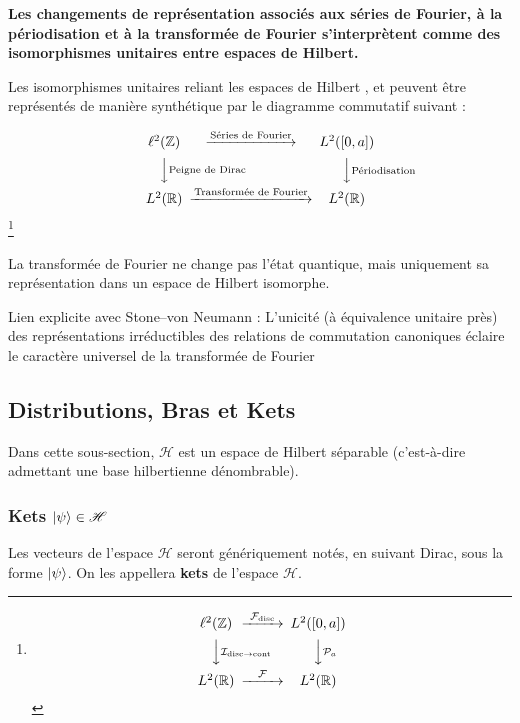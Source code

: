 {\bf
Les changements de représentation associés aux séries de Fourier, à la périodisation et à la transformée de Fourier s’interprètent comme des isomorphismes unitaires entre espaces de Hilbert.

\smallskip 

Les isomorphismes unitaires reliant les espaces de Hilbert ,   et  peuvent être représentés de manière synthétique par le diagramme commutatif suivant :

\[
\begin{CD}
\ell^2(\mathbb Z) @>\text{Séries de Fourier}>> L^2([0,a]) \\
@VV\text{Peigne de Dirac}V @VV\text{Périodisation}V \\
L^2(\mathbb R) @>\text{Transformée de Fourier}>> L^2(\mathbb R)
\end{CD}
\]
\footnote{
\[
\begin{CD}
\ell^2(\mathbb Z) @>\mathcal{F}_{\mathrm{disc}}>> L^2([0,a]) \\
@VV\mathcal{I}_{\mathrm{disc}\to\mathrm{cont}}V @VV\mathcal{P}_a V \\
L^2(\mathbb R) @>\mathcal{F}>> L^2(\mathbb R)
\end{CD}
\]
}


 La transformée de Fourier ne change pas l’état quantique, mais uniquement sa représentation dans un espace de Hilbert isomorphe.

\medskip 

Lien explicite avec Stone–von Neumann : L’unicité (à équivalence unitaire près) des représentations irréductibles des relations de commutation canoniques éclaire le caractère universel de la transformée de Fourier
}


\subsection{Distributions, Bras et Kets}

Dans cette sous-section, $\mathscr H$ est un espace de Hilbert séparable (c'est-à-dire admettant une base hilbertienne dénombrable).

\subsubsection{Kets $\ket{\psi}\in\mathscr H$}

\begin{Defi}[\bf Kets] Les vecteurs de l'espace $\mathscr H$ seront génériquement notés, en suivant Dirac, sous la forme $\ket{\psi}$. On les appellera {\bf kets} de l'espace $\mathscr H$.\end{Defi}

